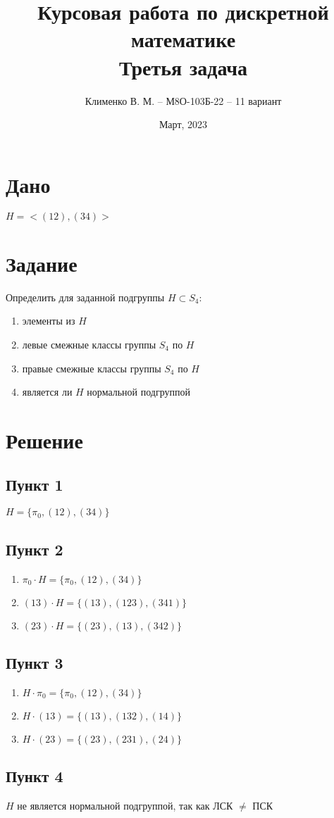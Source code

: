 \documentclass{article}
\title{Курсовая работа по дискретной математике\\Третья задача}
\author{Клименко В. М. -- М8О-103Б-22 -- 11 вариант}
\date{Март, 2023}
\begin{document}
\maketitle


\section*{Дано}
$H = <(12), (34)>$


\section*{Задание}
Определить для заданной подгруппы $H \subset S_4$:
\begin{enumerate}
    \item элементы из $H$
    \item левые смежные классы группы $S_4$ по $H$
    \item правые смежные классы группы $S_4$ по $H$
    \item является ли $H$ нормальной подгруппой
\end{enumerate}


\section*{Решение}
\subsection*{Пункт 1}
$H = \{\pi_0, (12),(34)\}$

\subsection*{Пункт 2}
\begin{enumerate}
    \item $\pi_0 \cdot H = \{\pi_0, (12), (34)\}$
    \item $(13) \cdot H = \{(13), (123), (341)\}$
    \item $(23) \cdot H = \{(23), (13), (342)\}$
\end{enumerate}

\subsection*{Пункт 3}
\begin{enumerate}
    \item $H \cdot \pi_0 = \{\pi_0, (12), (34)\}$
    \item $H \cdot (13) = \{(13), (132), (14)\}$
    \item $H \cdot (23) = \{(23), (231), (24)\}$
\end{enumerate}

\subsection*{Пункт 4}
$H$ не является нормальной подгруппой, так как ЛСК $\ne$ ПСК
\end{document}
